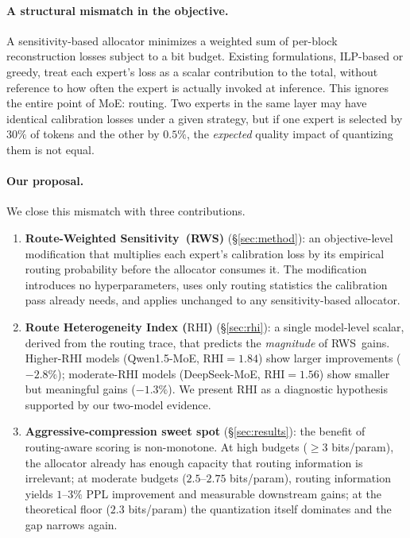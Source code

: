 \documentclass{article}
\newcommand{\method}{\textsc{RWS}\xspace}
\newcommand{\longmethod}{Route-Weighted Sensitivity\xspace}
\newcommand{\rhi}{\mathrm{RHI}}
\begin{document}
\paragraph{A structural mismatch in the objective.} A sensitivity-based allocator minimizes a weighted sum of per-block reconstruction losses subject to a bit budget. Existing formulations, ILP-based or greedy, treat each expert's loss as a scalar contribution to the total, without reference to how often the expert is actually invoked at inference. This ignores the entire point of MoE: routing. Two experts in the same layer may have identical calibration losses under a given strategy, but if one expert is selected by $30\%$ of tokens and the other by $0.5\%$, the \emph{expected} quality impact of quantizing them is not equal.

\paragraph{Our proposal.} We close this mismatch with three contributions.

\begin{enumerate}
\item \textbf{\longmethod\ (\method)} (\S\ref{sec:method}): an objective-level modification that multiplies each expert's calibration loss by its empirical routing probability before the allocator consumes it. The modification introduces no hyperparameters, uses only routing statistics the calibration pass already needs, and applies unchanged to any sensitivity-based allocator.
\item \textbf{Route Heterogeneity Index ($\rhi$)} (\S\ref{sec:rhi}): a single model-level scalar, derived from the routing trace, that predicts the \emph{magnitude} of \method\ gains. Higher-$\rhi$ models (Qwen1.5-MoE, $\rhi = 1.84$) show larger improvements ($-2.8\%$); moderate-$\rhi$ models (DeepSeek-MoE, $\rhi = 1.56$) show smaller but meaningful gains ($-1.3\%$). We present $\rhi$ as a diagnostic hypothesis supported by our two-model evidence.
\item \textbf{Aggressive-compression sweet spot} (\S\ref{sec:results}): the benefit of routing-aware scoring is non-monotone. At high budgets ($\ge 3$ bits/param), the allocator already has enough capacity that routing information is irrelevant; at moderate budgets ($2.5$--$2.75$ bits/param), routing information yields $1$--$3\%$ PPL improvement and measurable downstream gains; at the theoretical floor ($2.3$ bits/param) the quantization itself dominates and the gap narrows again.
\end{enumerate}
\end{document}
